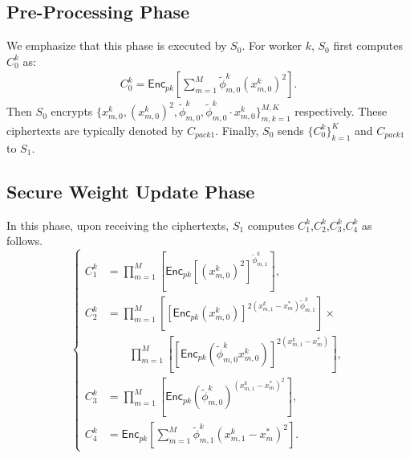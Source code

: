 \documentclass[conference]{IEEEtran}
\begin{document}
\subsection{Pre-Processing Phase}
We emphasize that this phase is executed by $S_0$.
For worker $k$, $S_0$ first computes $C_0^k$ as: 
\begin{equation*}
  \begin{split}
  C_0^k = \mathsf{Enc}_{pk}\left[\sum_{m=1}^M \tilde{\phi}_{m,0}^k \left(x_{m,0}^k\right)^2\right].
  \end{split}
\end{equation*}
Then $S_0$ encrypts $\{x_{m,0}^k, (x_{m,0}^k)^2, \tilde{\phi}_{m,0}^k,\tilde{\phi}_{m,0}^k\cdot x_{m,0}^k\}_{m,k=1}^{M,K}$ respectively.
These ciphertexts are typically denoted by $C_{pack1}$.
Finally, $S_0$ sends $\{C_0^k\}_{k=1}^K$ and $C_{pack1}$ to $S_1$.

\subsection{Secure Weight Update Phase}
In this phase, upon receiving the ciphertexts, $S_1$ computes $C_1^k$,$C_2^k$,$C_3^k$,$C_4^k$ as follows.
\begin{equation*}
  \left\{\begin{aligned}
    C_1^k & = \prod_{m=1}^M\left[ \mathsf{Enc}_{pk}{\left[\left(x_{m,0}^k\right)^2\right]}^{\tilde{\phi}_{m,1}^k} \right] , \\
    C_2^k & =  \prod_{m=1}^M\left[ \left[\mathsf{Enc}_{pk}\left(x_{m,0}^k\right)\right]^{2\left(x_{m,1}^k - x_m^*\right)\tilde{\phi}_{m,1}^k}\right] \times \\
          & \qquad \prod_{m=1}^M\left[ \left[\mathsf{Enc}_{pk}\left(\tilde{\phi}_{m,0}^k x_{m,0}^k\right)\right]^{2\left(x_{m,1}^k - x_m^*\right)} \right] , \\
     C_3^k & = \prod_{m=1}^M\left[ \mathsf{Enc}_{pk}\left(\tilde{\phi}_{m,0}^k\right)^{\left(x_{m,1}^k - x_m^*\right)^2} \right] , \\
     C_4^k & = \mathsf{Enc}_{pk}\left[\sum_{m=1}^M \tilde{\phi}_{m,1}^k \left(x_{m,1}^k - x_m^*\right)^2\right] .
    \end{aligned}
    \right.
\end{equation*}
\end{document}
